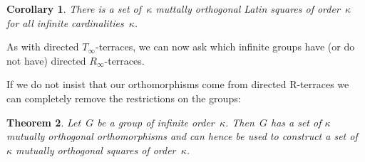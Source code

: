 \documentclass[12pt,a4paper]{article}
\newtheorem{thm}{Theorem}[section]
\newtheorem{cor}[thm]{Corollary}
\begin{document}
\begin{cor}
There is a set of~$\kappa$ muttally orthogonal Latin squares of order~$\kappa$ for all infinite cardinalities~$\kappa$.
\end{cor}

As with directed $T_{\infty}$-terraces, we can now ask which infinite groups have (or do not have) directed $R_{\infty}$-terraces.

If we do not insist that our orthomorphisms come from directed R-terraces we can completely remove the restrictions on the groups:

\begin{thm}
Let~$G$ be a group of infinite order~$\kappa$.  Then~$G$ has a set of $\kappa$ mutually orthogonal orthomorphisms and can hence be used to construct a set of~$\kappa$ mutually orthogonal squares of order~$\kappa$.
\end{thm}
\end{document}
